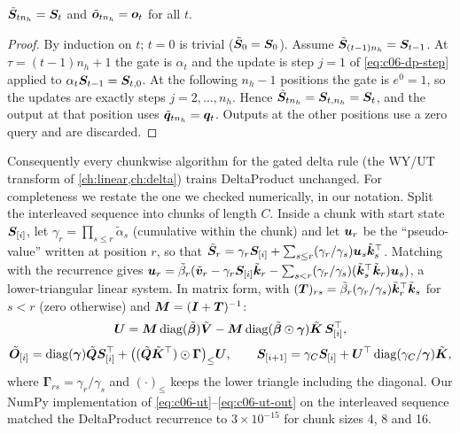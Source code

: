 \begin{proposition}\label{prop:c06-interleave}
$\tilde{\bm{S}}_{tn_h}=\bm{S}_t$ and $\tilde{\bm{o}}_{tn_h}=\bm{o}_t$ for all $t$.
\end{proposition}
\begin{proof}
By induction on $t$; $t=0$ is trivial ($\tilde{\bm{S}}_0=\bm{S}_0$). Assume
$\tilde{\bm{S}}_{(t-1)n_h}=\bm{S}_{t-1}$. At $\tau=(t-1)n_h+1$ the gate is $\alpha_t$ and the update
is step $j=1$ of \eqref{eq:c06-dp-step} applied to $\alpha_t\bm{S}_{t-1}=\bm{S}_{t,0}$. At the
following $n_h-1$ positions the gate is $e^0=1$, so the updates are exactly steps
$j=2,\dots,n_h$. Hence $\tilde{\bm{S}}_{tn_h}=\bm{S}_{t,n_h}=\bm{S}_t$, and the output at that position
uses $\tilde{\bm{q}}_{tn_h}=\bm{q}_t$. Outputs at the other positions use a zero query and are
discarded.
\end{proof}

Consequently every chunkwise algorithm for the gated delta rule (the WY/UT transform of
\cref{ch:linear,ch:delta}) trains DeltaProduct unchanged. For completeness we restate the
one we checked numerically, in our notation. Split the interleaved sequence into chunks of
length $C$. Inside a chunk with start state $\bm{S}_{[i]}$, let
$\gamma_r=\prod_{s\le r}\tilde\alpha_s$ (cumulative within the chunk) and let
$\bm{u}_r$ be the ``pseudo-value'' written at position $r$, so that
$\tilde{\bm{S}}_r=\gamma_r\bm{S}_{[i]}+\sum_{s\le r}(\gamma_r/\gamma_s)\bm{u}_s\tilde{\bm{k}}_s^{\top}$. Matching
with the recurrence gives
$\bm{u}_r=\tilde\beta_r(\tilde{\bm{v}}_r-\gamma_r\bm{S}_{[i]}\tilde{\bm{k}}_r-\sum_{s<r}(\gamma_r/\gamma_s)(\tilde{\bm{k}}_s^{\top}\tilde{\bm{k}}_r)\bm{u}_s)$,
a lower-triangular linear system. In matrix form, with
$(\bm{T})_{rs}=\tilde\beta_r(\gamma_r/\gamma_s)\tilde{\bm{k}}_r^{\top}\tilde{\bm{k}}_s$ for $s<r$ (zero
otherwise) and $\bm{M}=(\bm{I}+\bm{T})^{-1}$:
\begin{equation}\label{eq:c06-ut}
  \bm{U}=\bm{M}\operatorname{diag}(\tilde{\bm{\beta}})\tilde{\bm{V}}-\bm{M}\operatorname{diag}(\tilde{\bm{\beta}}\odot\bm{\gamma})\tilde{\bm{K}}\,\bm{S}_{[i]}^{\top},
\end{equation}
\begin{equation}\label{eq:c06-ut-out}
  \tilde{\bm{O}}_{[i]}=\operatorname{diag}(\bm{\gamma})\tilde{\bm{Q}}\bm{S}_{[i]}^{\top}+\big((\tilde{\bm{Q}}\tilde{\bm{K}}^{\top})\odot\bm{\Gamma}\big)_{\le}\bm{U},\qquad
  \bm{S}_{[i+1]}=\gamma_C\bm{S}_{[i]}+\bm{U}^{\top}\operatorname{diag}(\gamma_C/\bm{\gamma})\tilde{\bm{K}},
\end{equation}
where $\bm{\Gamma}_{rs}=\gamma_r/\gamma_s$ and $(\cdot)_{\le}$ keeps the lower triangle including
the diagonal. Our NumPy implementation of \eqref{eq:c06-ut}--\eqref{eq:c06-ut-out} on the
interleaved sequence matched the DeltaProduct recurrence to $3\times10^{-15}$ for chunk sizes
4, 8 and 16.

